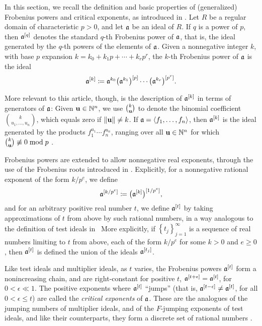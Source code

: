 \documentclass[11pt]{amsart}
\begin{document}
{\color{green}

In this section, we recall the definition and basic properties of (generalized) Frobenius powers and critical exponents, as introduced in \cite{hernandez+etal.frobenius_powers}.
Let $R$ be a regular domain of characteristic $p > 0$, and let $\mathfrak{a}$ be an ideal of $R$.
If $q$ is a power of $p$, then $\mathfrak{a}^{[q]}$ denotes the standard $q$-th Frobenius power of $\mathfrak{a}$, that is, the ideal generated by the $q$-th powers of the elements of $\mathfrak{a}$.
Given a nonnegative integer $k$, with base $p$ expansion $k = k_0 + k_1 p + \cdots + k_r p^r$, the $k$-th Frobenius power of $\mathfrak{a}$ is the ideal
\[\mathfrak{a}^{[k]} \coloneqq \mathfrak{a}^{k_0}\big(\mathfrak{a}^{k_1}\big)^{[p]}\cdots \big(\mathfrak{a}^{k_r}\big)^{[p^r]}.\]


More relevant to this article, though, is the description of $\mathfrak{a}^{[k]}$ in terms of generators of $\mathfrak{a}$:
Given $\mathbf{u} \in \mathbb{N}^n$, we use
$\binom{k}{\mathbf{u}}$ to denote the binomial coefficient $\binom{k}{u_1,\ldots,u_n}$, which equals zero if $\| \mathbf{u} \| \neq k$.
If $\mathfrak{a} = \langle f_1,\ldots,f_n \rangle$, then $\mathfrak{a}^{[k]}$ is the ideal generated by the products $f_1^{u_1}\cdots f_n^{u_n}$, ranging over all $\mathbf{u} \in \mathbb{N}^n$ for which $\binom{k}{\mathbf{u}}\not\equiv 0\bmod{p}$ \cite[Proposition~3.5]{hernandez+etal.frobenius_powers}.


Frobenius powers are extended to allow nonnegative real exponents, through the use of the Frobenius roots introduced in \cite{blickle+mustata+smith.discr_rat_FPTs}.
Explicitly, for a nonnegative rational exponent of the form $k/p^e$, we define
\[\mathfrak{a}^{[k/p^e]} \coloneqq \big(\mathfrak{a}^{[k]}\big)^{[1/p^e]},\]
and for an arbitrary positive real number $t$, we define $\mathfrak{a}^{[t]}$ by taking approximations of $t$ from above by such rational numbers, in a way analogous to the definition of test ideals in \loccit\
More explicitly, if $\left\{t_j\right\}_{j=1}^\infty$ is a sequence of real numbers limiting to $t$ from above, each of the form $k/p^e$ for some $k>0$ and $e \geq 0$, then $\mathfrak{a}^{[t]}$ is defined the union of the ideals $\mathfrak{a}^{[t_j]}$.

Like test ideals and multiplier ideals, as $t$ varies, the Frobenius powers $\mathfrak{a}^{[t]}$ form a nonincreasing chain, and are right-constant for positive $t$, \ie $\mathfrak{a}^{[t+\epsilon]} = \mathfrak{a}^{[t]}$, for $0<\epsilon \ll 1$.
The positive exponents where $\mathfrak{a}^{[t]}$ ``jumps'' (that is, $\mathfrak{a}^{[t-\epsilon]}\ne \mathfrak{a}^{[t]}$, for all $0<\epsilon \le t$) are called the \emph{critical exponents} of $\mathfrak{a}$.
These are the analogues of the jumping numbers of multiplier ideals, and of the $F$-jumping exponents of test ideals, and like their counterparts, they form a discrete set of rational numbers \cite[Corollary~5.8]{hernandez+etal.frobenius_powers}.

}
\end{document}
